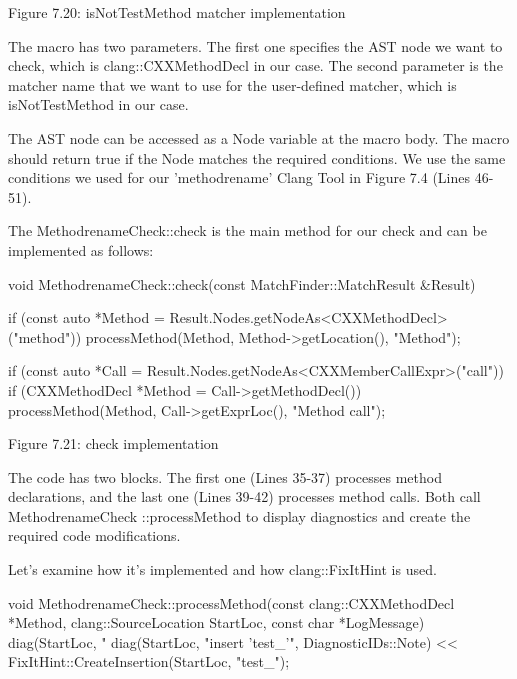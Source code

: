 \begin{center}
Figure 7.20: isNotTestMethod matcher implementation
\end{center}

The macro has two parameters. The first one specifies the AST node we want to check, which is clang::CXXMethodDecl in our case. The second parameter is the matcher name that we want to use for the user-defined matcher, which is isNotTestMethod in our case.

The AST node can be accessed as a Node variable at the macro body. The macro should return true if the Node matches the required conditions. We use the same conditions we used for our ’methodrename’ Clang Tool in Figure 7.4 (Lines 46-51).

The MethodrenameCheck::check is the main method for our check and can be implemented as follows:

\begin{cpp}
void MethodrenameCheck::check(const MatchFinder::MatchResult &Result) {
  if (const auto *Method = Result.Nodes.getNodeAs<CXXMethodDecl>("method")) {
    processMethod(Method, Method->getLocation(), "Method");
  }

  if (const auto *Call = Result.Nodes.getNodeAs<CXXMemberCallExpr>("call")) {
    if (CXXMethodDecl *Method = Call->getMethodDecl()) {
      processMethod(Method, Call->getExprLoc(), "Method call");
    }
  }
}
\end{cpp}

\begin{center}
Figure 7.21: check implementation
\end{center}

The code has two blocks. The first one (Lines 35-37) processes method declarations, and the last one (Lines 39-42) processes method calls. Both call MethodrenameCheck ::processMethod to display diagnostics and create the required code modifications.

Let’s examine how it’s implemented and how clang::FixItHint is used.

\begin{cpp}
void MethodrenameCheck::processMethod(const clang::CXXMethodDecl *Method,
                                      clang::SourceLocation StartLoc,
                                      const char *LogMessage) {
  diag(StartLoc, "%
  diag(StartLoc, "insert ’test_’", DiagnosticIDs::Note)
    << FixItHint::CreateInsertion(StartLoc, "test_");
}
\end{cpp}

